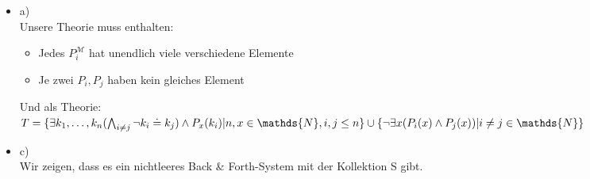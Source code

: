 \documentclass[a4paper]{scrartcl}%
\begin{document}
    \begin{itemize}
        \item a)\\
            Unsere Theorie muss enthalten:\\
            \begin{itemize}
                \item Jedes $P_i^\mathcal{M}$ hat unendlich viele verschiedene Elemente\\
                \item Je zwei $P_i, P_j$ haben kein gleiches Element\\
            \end{itemize}
            Und als Theorie:\\
            $T = \{\exists k_1,\dots,k_n(\bigwedge_{i \neq j} \neg k_i \doteq k_j) \land P_x(k_i)| n,x \in \mathds{N}, i,j\leq n\}\\
            \cup \{\neg \exists x (P_i(x) \land P_j(x)) | i \neq j \in \mathds{N}\}$\\

        \item c)\\
            Wir zeigen, dass es ein nichtleeres Back \& Forth-System mit der Kollektion S gibt.\\
            

\end{itemize}
\end{document}
